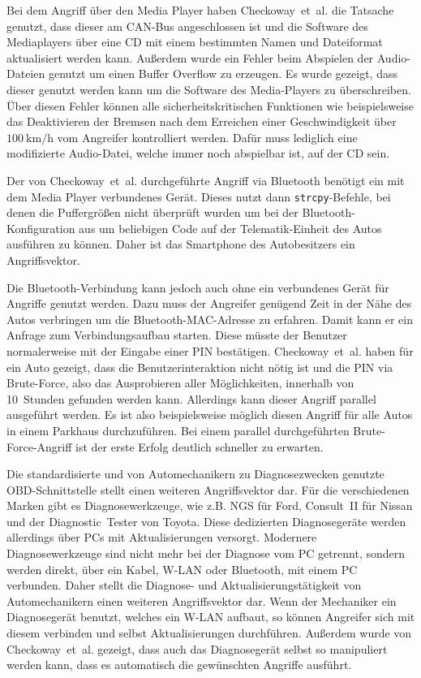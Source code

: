 Bei dem Angriff über den Media Player haben Checkoway~et~al. die Tatsache
genutzt, dass dieser am CAN-Bus angeschlossen ist und die Software des
Mediaplayers über eine CD mit einem bestimmten Namen und Dateiformat
aktualisiert werden kann. Außerdem wurde ein Fehler beim Abspielen der
Audio-Dateien genutzt um einen Buffer Overflow zu erzeugen. Es wurde gezeigt,
dass dieser genutzt werden kann um die Software des Media-Players zu
überschreiben. Über diesen Fehler können alle sicherheitskritischen Funktionen
wie beispielsweise das Deaktivieren der Bremsen nach dem Erreichen einer
Geschwindigkeit über $\SI[per-mode=fraction]{100}{\km\per\hour}$ vom Angreifer
kontrolliert werden. Dafür muss lediglich eine modifizierte Audio-Datei, welche
immer noch abspielbar ist, auf der CD sein.

Der von Checkoway~et~al. durchgeführte Angriff via Bluetooth benötigt ein
mit dem Media Player verbundenes Gerät. Dieses nutzt dann
\verb+strcpy+-Befehle, bei denen die Puffergrößen nicht überprüft wurden um bei
der Bluetooth-Konfiguration aus um beliebigen Code auf der Telematik-Einheit
des Autos ausführen zu können. Daher ist das Smartphone des Autobesitzers ein
Angriffsvektor.

Die Bluetooth-Verbindung kann jedoch auch ohne ein verbundenes Gerät für
Angriffe genutzt werden. Dazu muss der Angreifer genügend Zeit in der Nähe des
Autos verbringen um die Bluetooth-MAC-Adresse zu erfahren. Damit kann er ein
Anfrage zum Verbindungsaufbau starten. Diese müsste der Benutzer normalerweise
mit der Eingabe einer PIN bestätigen. Checkoway~et~al. haben für ein Auto
gezeigt, dass die Benutzerinteraktion nicht nötig ist und die PIN via
Brute-Force, also das Ausprobieren aller Möglichkeiten, innerhalb von
10~Stunden gefunden werden kann. Allerdings kann dieser Angriff parallel
ausgeführt werden. Es ist also beispielsweise möglich diesen Angriff für alle
Autos in einem Parkhaus durchzuführen. Bei einem parallel durchgeführten
Brute-Force-Angriff ist der erste Erfolg deutlich schneller zu erwarten.

Die standardisierte und von Automechanikern zu Diagnosezwecken genutzte
OBD-Schnittstelle stellt einen weiteren Angriffs\-vektor dar. Für die
verschiedenen Marken gibt es Diagnose\-werkzeuge, wie z.B. NGS für Ford,
Consult~II für Nissan und der Diagnostic~Tester von Toyota. Diese dedizierten
Diagnose\-geräte werden allerdings über PCs mit Aktualisierungen versorgt.
Modernere Diagnose\-werkzeuge sind nicht mehr bei der Diagnose vom PC getrennt,
sondern werden direkt, über ein Kabel, \mbox{W-LAN} oder Bluetooth, mit einem PC
verbunden. Daher stellt die Diagnose- und Aktualisierungs\-tätigkeit von
Automechanikern einen weiteren Angriffs\-vektor dar. Wenn der Mechaniker ein
Diagnose\-gerät benutzt, welches ein \mbox{W-LAN} aufbaut, so können Angreifer
sich mit diesem verbinden und selbst Aktualisierungen durchführen. Außerdem
wurde von Checkoway~et~al. gezeigt, dass auch das Diagnose\-gerät selbst so
manipuliert werden kann, dass es automatisch die gewünschten Angriffe ausführt.

